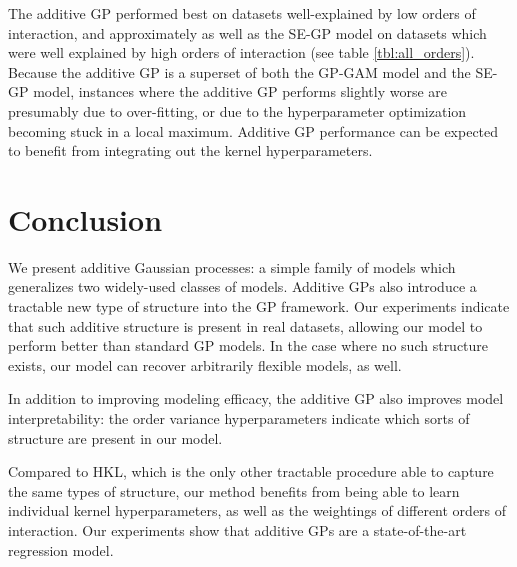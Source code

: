The additive GP performed best on datasets well-explained by low orders of interaction, and approximately as well as the SE-GP model on datasets which were well explained by high orders of interaction (see table \ref{tbl:all_orders}).
Because the additive GP is a superset of both the GP-GAM model and the SE-GP model, instances where the additive GP performs slightly worse are presumably due to over-fitting, or due to the hyperparameter optimization becoming stuck in a local maximum. %
Additive GP performance can be expected to benefit from integrating out the kernel hyperparameters.



\section{Conclusion}

We present additive Gaussian processes: a simple family of models which generalizes two widely-used classes of models.  Additive GPs also introduce a tractable new type of structure into the GP framework.   Our experiments indicate that such additive structure is present in real datasets, allowing our model to perform better than standard GP models.  In the case where no such structure exists, our model can recover arbitrarily flexible models, as well.

In addition to improving modeling efficacy, the additive GP also improves model interpretability:  the order variance hyperparameters indicate which sorts of structure are present in our model.

Compared to HKL, which is the only other tractable procedure able to capture the same types of structure, our method benefits from being able to learn individual kernel hyperparameters, as well as the weightings of different orders of interaction.  Our experiments show that additive GPs are a state-of-the-art regression model.



\outbpdocument{


}





